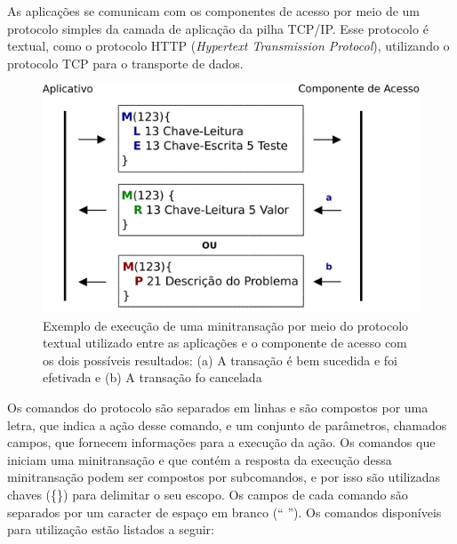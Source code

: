 \documentclass[11pt,twoside,a4paper]{book}
\begin{document}
As aplicações se comunicam com os componentes de acesso por meio de um protocolo simples da camada de aplicação da pilha TCP/IP. Esse protocolo é textual, como o protocolo HTTP (\emph{Hypertext Transmission Protocol}), utilizando o protocolo TCP para o transporte de dados. 

\begin{figure}
  \centering
  \includegraphics[width=.80\textwidth]{protocolo} 
  \caption{Exemplo de execução de uma minitransação por meio do protocolo textual utilizado entre as aplicações e o componente de acesso com os dois possíveis resultados: (a) A transação é bem sucedida e foi efetivada e (b) A transação fo cancelada}
  \label{fig:protocolo} 
\end{figure}

Os comandos do protocolo são separados em linhas e são compostos por uma letra, que indica a ação desse comando, e um conjunto de parâmetros, chamados campos, que fornecem informações para a execução da ação. Os comandos que iniciam uma minitransação e que contém a resposta da execução dessa minitransação podem ser compostos por subcomandos, e por isso são utilizadas chaves (\{\}) para delimitar o seu escopo. Os campos de cada comando são separados por um caracter de espaço em branco (`` ''). Os comandos disponíveis para utilização estão listados a seguir:
\end{document}
